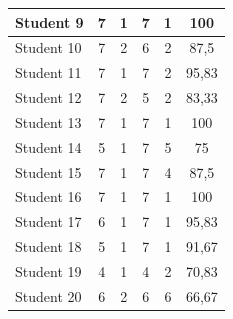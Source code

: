 \documentclass[conference,a4paper]{IEEEtran}
\begin{document}
\begin{table}[htbp]
{\begin{tabular}{|l|c|c|c|c|c|}
      Student 9                              & 7                                             & 1                                     & 7          & 1          & 100   \\ \hline
      Student 10                             & 7                                             & 2                                     & 6          & 2          & 87,5  \\ \hline
      Student 11                             & 7                                             & 1                                     & 7          & 2          & 95,83 \\ \hline
      Student 12                             & 7                                             & 2                                     & 5          & 2          & 83,33 \\ \hline
      Student 13                             & 7                                             & 1                                     & 7          & 1          & 100   \\ \hline
      Student 14                             & 5                                             & 1                                     & 7          & 5          & 75    \\ \hline
      Student 15                             & 7                                             & 1                                     & 7          & 4          & 87,5  \\ \hline
      Student 16                             & 7                                             & 1                                     & 7          & 1          & 100   \\ \hline
      Student 17                             & 6                                             & 1                                     & 7          & 1          & 95,83 \\ \hline
      Student 18                             & 5                                             & 1                                     & 7          & 1          & 91,67 \\ \hline
      Student 19                             & 4                                             & 1                                     & 4          & 2          & 70,83 \\ \hline
      Student 20                             & 6                                             & 2                                     & 6          & 6          & 66,67 \\ \hline

\end{tabular}}
\end{table}
\end{document}
